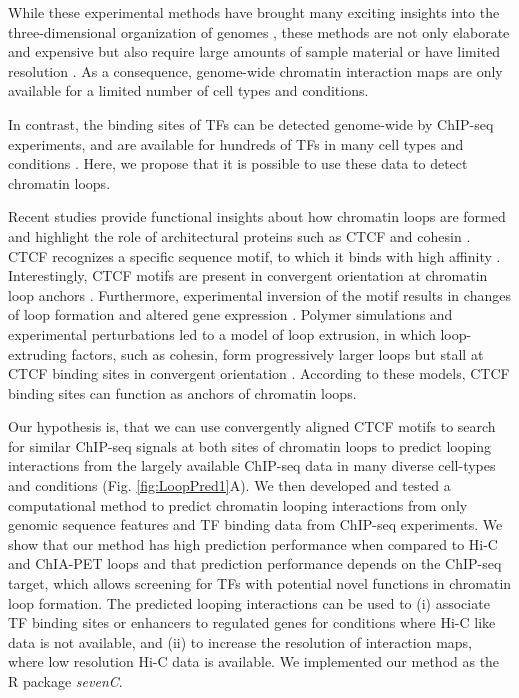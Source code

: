 \documentclass[a4paper,twoside=true,openright,parskip=full,chapterprefix=true,11pt,headings=normal,bibliography=totoc,listof=totoc,titlepage=on,captions=tableabove,draft=false]{scrreprt}
\theoremstyle{definition}
\theoremstyle{definition}
\theoremstyle{definition}
\theoremstyle{remark}
\begin{document}
While these experimental methods have brought many exciting insights
into the three-dimensional organization of genomes
\citep{Merkenschlager2016, Krijger2016, Bonev2016}, these methods are
not only elaborate and expensive but also require large amounts of
sample material or have limited resolution
\citep{Sati2016, Schmitt2016}. As a consequence, genome-wide chromatin
interaction maps are only available for a limited number of cell types
and conditions.

In contrast, the binding sites of TFs can be detected genome-wide by
ChIP-seq experiments, and are available for hundreds of TFs in many cell
types and conditions \citep{Dunham2012, Davis2017}. Here, we propose
that it is possible to use these data to detect chromatin loops.

Recent studies provide functional insights about how chromatin loops are
formed and highlight the role of architectural proteins such as CTCF and
cohesin \citep{Merkenschlager2016}. CTCF recognizes a specific sequence
motif, to which it binds with high affinity \citep{Kim2007, Nagy2016}.
Interestingly, CTCF motifs are present in convergent orientation at
chromatin loop anchors \citep{Rao2014, Tang2015, VietriRudan2015}.
Furthermore, experimental inversion of the motif results in changes of
loop formation and altered gene expression \citep{Guo2015, deWit2015}.
Polymer simulations and experimental perturbations led to a model of
loop extrusion, in which loop-extruding factors, such as cohesin, form
progressively larger loops but stall at CTCF binding sites in convergent
orientation \citep{Sanborn2015, Fudenberg2016}. According to these
models, CTCF binding sites can function as anchors of chromatin loops.

Our hypothesis is, that we can use convergently aligned CTCF motifs to
search for similar ChIP-seq signals at both sites of chromatin loops to
predict looping interactions from the largely available ChIP-seq data in
many diverse cell-types and conditions (Fig. \ref{fig:LoopPred1}A). We
then developed and tested a computational method to predict chromatin
looping interactions from only genomic sequence features and TF binding
data from ChIP-seq experiments. We show that our method has high
prediction performance when compared to Hi-C and ChIA-PET loops and that
prediction performance depends on the ChIP-seq target, which allows
screening for TFs with potential novel functions in chromatin loop
formation. The predicted looping interactions can be used to (i)
associate TF binding sites or enhancers to regulated genes for
conditions where Hi-C like data is not available, and (ii) to increase
the resolution of interaction maps, where low resolution Hi-C data is
available. We implemented our method as the R package \emph{sevenC}.
\end{document}
